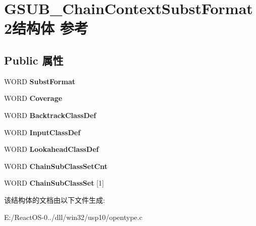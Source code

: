 \hypertarget{struct_g_s_u_b___chain_context_subst_format2}{}\section{G\+S\+U\+B\+\_\+\+Chain\+Context\+Subst\+Format2结构体 参考}
\label{struct_g_s_u_b___chain_context_subst_format2}
\subsection*{Public 属性}
\begin{DoxyCompactItemize}
\item 
\mbox{\label{struct_g_s_u_b___chain_context_subst_format2_a159e31d67d13f1d2c6b2f9037da0ea80}} 
W\+O\+RD {\bfseries Subst\+Format}
\item 
\mbox{\label{struct_g_s_u_b___chain_context_subst_format2_afb91f33176e57134f090a99237fd4273}} 
W\+O\+RD {\bfseries Coverage}
\item 
\mbox{\label{struct_g_s_u_b___chain_context_subst_format2_a2689bb25b4b8cb19ddeac5a89cb35f0a}} 
W\+O\+RD {\bfseries Backtrack\+Class\+Def}
\item 
\mbox{\label{struct_g_s_u_b___chain_context_subst_format2_ae9524ad0f59fcd485a3891dabf6ce0c6}} 
W\+O\+RD {\bfseries Input\+Class\+Def}
\item 
\mbox{\label{struct_g_s_u_b___chain_context_subst_format2_a25a02a7502a48578f6a4a627132fb8af}} 
W\+O\+RD {\bfseries Lookahead\+Class\+Def}
\item 
\mbox{\label{struct_g_s_u_b___chain_context_subst_format2_ac9274f9d1194eb25d1d5bdad3616ecdc}} 
W\+O\+RD {\bfseries Chain\+Sub\+Class\+Set\+Cnt}
\item 
\mbox{\label{struct_g_s_u_b___chain_context_subst_format2_aa96c18ba84ba1d7320d94c6b8afe2e53}} 
W\+O\+RD {\bfseries Chain\+Sub\+Class\+Set} \mbox{[}1\mbox{]}
\end{DoxyCompactItemize}


该结构体的文档由以下文件生成\+:\begin{DoxyCompactItemize}
\item 
E\+:/\+React\+O\+S-\/0../dll/win32/usp10/opentype.\+c\end{DoxyCompactItemize}
